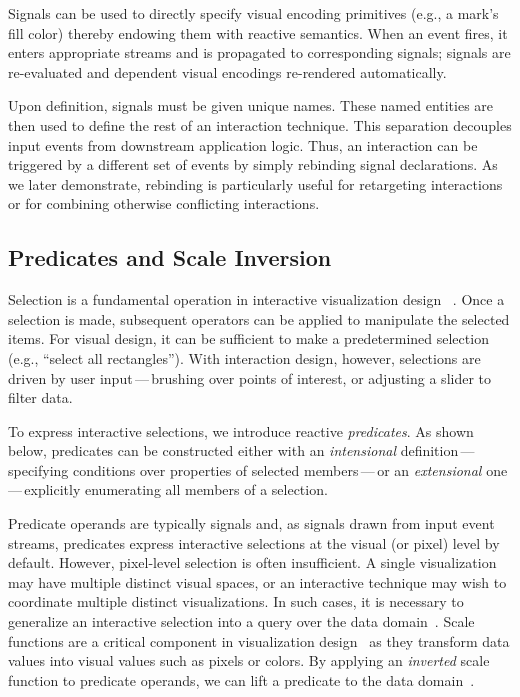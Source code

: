 Signals can be used to directly specify visual encoding primitives (e.g., a
mark's fill color) thereby endowing them with reactive semantics. When an event
fires, it enters appropriate streams and is propagated to corresponding signals;
signals are re-evaluated and dependent visual encodings re-rendered
automatically.

Upon definition, signals must be given unique names. These named entities are
then used to define the rest of an interaction technique. This separation
decouples input events from downstream application logic. Thus, an interaction
can be triggered by a different set of events by simply rebinding signal
declarations. As we later demonstrate, rebinding is particularly useful for
retargeting interactions or for combining otherwise conflicting interactions.

\subsection{Predicates and Scale Inversion}

Selection is a fundamental operation in interactive visualization design~
\cite{heer:generalized}. Once a selection is made, subsequent operators can be
applied to manipulate the selected items. For visual design, it can be
sufficient to make a predetermined selection (e.g., ``select all rectangles'').
With interaction design, however, selections are driven by user
input\,---\,brushing over points of interest, or adjusting a slider to filter
data.

To express interactive selections, we introduce reactive \emph{predicates}.
As shown below, predicates can be constructed either with an \emph{intensional}
definition\,---\,specifying conditions over properties of selected
members\,---\,or an \emph{extensional} one\,---\,explicitly enumerating all
members of a selection.


Predicate operands are typically signals and, as signals drawn from input event
streams, predicates express interactive selections at the visual (or pixel)
level by default. However, pixel-level selection is often insufficient. A single
visualization may have multiple distinct visual spaces, or an interactive
technique may wish to coordinate multiple distinct visualizations. In such
cases, it is necessary to generalize an interactive selection into a query over
the data domain~\cite{heer:generalized}. Scale functions are a critical
component in visualization design~ \cite{wilkinson:grammar} as they transform
data values into visual values such as pixels or colors. By applying an
\emph{inverted} scale function to predicate operands, we can lift a predicate to
the data domain~\cite{derthick:vqe}.

